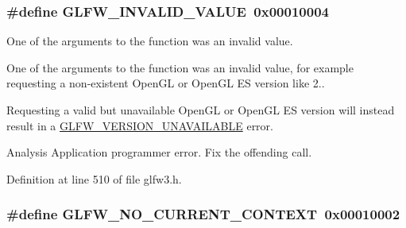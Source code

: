 \hypertarget{group__errors_gaaf2ef9aa8202c2b82ac2d921e554c687}{}
\subsubsection[{G\+L\+F\+W\+\_\+\+I\+N\+V\+A\+L\+I\+D\+\_\+\+V\+A\+L\+U\+E}]{\setlength{\rightskip}{0pt plus 5cm}\#define G\+L\+F\+W\+\_\+\+I\+N\+V\+A\+L\+I\+D\+\_\+\+V\+A\+L\+U\+E~0x00010004}\label{group__errors_gaaf2ef9aa8202c2b82ac2d921e554c687}


One of the arguments to the function was an invalid value. 

One of the arguments to the function was an invalid value, for example requesting a non-\/existent Open\+G\+L or Open\+G\+L E\+S version like 2..

Requesting a valid but unavailable Open\+G\+L or Open\+G\+L E\+S version will instead result in a \hyperlink{group__errors_gad16c5565b4a69f9c2a9ac2c0dbc89462}{G\+L\+F\+W\+\_\+\+V\+E\+R\+S\+I\+O\+N\+\_\+\+U\+N\+A\+V\+A\+I\+L\+A\+B\+L\+E} error.

\begin{DoxyParagraph}{Analysis}
Application programmer error. Fix the offending call. 
\end{DoxyParagraph}


Definition at line 510 of file glfw3.\+h.

\hypertarget{group__errors_gaa8290386e9528ccb9e42a3a4e16fc0d0}{}
\subsubsection[{G\+L\+F\+W\+\_\+\+N\+O\+\_\+\+C\+U\+R\+R\+E\+N\+T\+\_\+\+C\+O\+N\+T\+E\+X\+T}]{\setlength{\rightskip}{0pt plus 5cm}\#define G\+L\+F\+W\+\_\+\+N\+O\+\_\+\+C\+U\+R\+R\+E\+N\+T\+\_\+\+C\+O\+N\+T\+E\+X\+T~0x00010002}\label{group__errors_gaa8290386e9528ccb9e42a3a4e16fc0d0}


